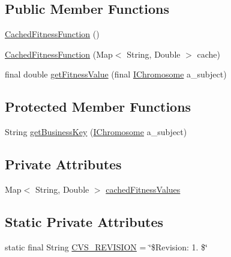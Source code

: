 \subsection*{Public Member Functions}
\begin{DoxyCompactItemize}
\item 
\hyperlink{classorg_1_1jgap_1_1_cached_fitness_function_aa9dcd784be94cfeee7d6437e9818f0c0}{Cached\-Fitness\-Function} ()
\item 
\hyperlink{classorg_1_1jgap_1_1_cached_fitness_function_a7ff94e1abb8dbb178ba278de372e0f6d}{Cached\-Fitness\-Function} (Map$<$ String, Double $>$ cache)
\item 
final double \hyperlink{classorg_1_1jgap_1_1_cached_fitness_function_a5c83cd337b2adc95adb5a46e674dd842}{get\-Fitness\-Value} (final \hyperlink{interfaceorg_1_1jgap_1_1_i_chromosome}{I\-Chromosome} a\-\_\-subject)
\end{DoxyCompactItemize}
\subsection*{Protected Member Functions}
\begin{DoxyCompactItemize}
\item 
String \hyperlink{classorg_1_1jgap_1_1_cached_fitness_function_a543b8a4679c3fd68f16467d844b5b01e}{get\-Business\-Key} (\hyperlink{interfaceorg_1_1jgap_1_1_i_chromosome}{I\-Chromosome} a\-\_\-subject)
\end{DoxyCompactItemize}
\subsection*{Private Attributes}
\begin{DoxyCompactItemize}
\item 
Map$<$ String, Double $>$ \hyperlink{classorg_1_1jgap_1_1_cached_fitness_function_a050080fb109ccbf262449ded034f08b4}{cached\-Fitness\-Values}
\end{DoxyCompactItemize}
\subsection*{Static Private Attributes}
\begin{DoxyCompactItemize}
\item 
static final String \hyperlink{classorg_1_1jgap_1_1_cached_fitness_function_ab281e35d33336f473dcc8a252ebcc932}{C\-V\-S\-\_\-\-R\-E\-V\-I\-S\-I\-O\-N} = \char`\"{}\$Revision\-: 1. \$\char`\"{}
\end{DoxyCompactItemize}
